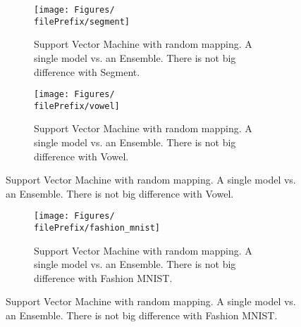 \begin{figure}[H]
  \centering
  \begin{subfigure}[t]{0.5\linewidth}
    \centering\captionsetup{width=.8\linewidth}\texttt{[image: Figures/\\filePrefix/segment]}
    \caption{Support Vector Machine with random mapping. A single model vs. an Ensemble. There is not big difference with Segment.}
    \label{fig:\undPrefix_segment}
  \end{subfigure}%
  \begin{subfigure}[t]{0.5\linewidth}
    \centering\captionsetup{width=.8\linewidth}\texttt{[image: Figures/\\filePrefix/vowel]}
    \caption{Support Vector Machine with random mapping. A single model vs. an Ensemble. There is not big difference with Vowel.}
    \label{fig:\undPrefix_vowel}
  \end{subfigure}
\end{figure}


\begin{figure}[H]
  \centering
  \begin{subfigure}[t]{0.5\linewidth}
    \centering\captionsetup{width=.8\linewidth}\texttt{[image: Figures/\\filePrefix/fashion\_mnist]}
    \caption{Support Vector Machine with random mapping. A single model vs. an Ensemble. There is not big difference with Fashion MNIST.}
    \label{fig:\undPrefix_segment}
  \end{subfigure}%
\end{figure}


\let\major\undefined
\let\minor\undefined

\let\undPrefix\undefined
\let\dotPrefix\undefined
\let\scoPrefix\undefined

\let\filePrefix\undefined
